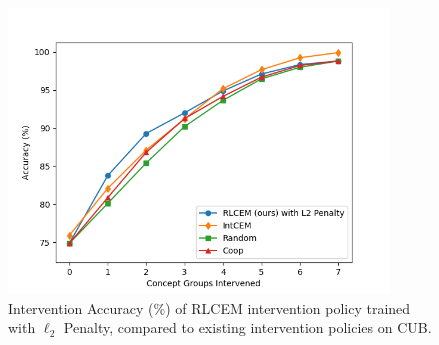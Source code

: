 \begin{figure}[!h]
    \centering
    \includegraphics[width=0.9\textwidth]{figs/evaluation/cub_rlcem_performance_l2.png}
    \caption{
        Intervention Accuracy (\%) of RLCEM intervention
        policy trained with $\ell_2$ Penalty, compared to existing intervention policies on CUB.
    }
    \label{fig:cub-rlcem_performance-l2}
\end{figure}


